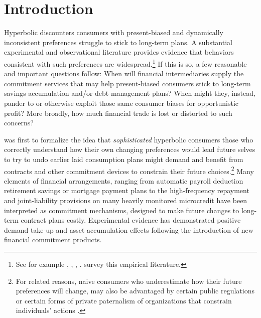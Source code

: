 \documentclass[11pt,english]{article}
\theoremstyle{plain}
\theoremstyle{definition}
\begin{document}
\section{Introduction}

Hyperbolic discounters \textendash{} consumers with present-biased
and dynamically inconsistent preferences \textendash{} struggle to
stick to long-term plans. A substantial experimental and observational
literature provides evidence that behaviors consistent with such preferences
are widespread.\footnote{See for example \citet{ariely2002}, \citet{thaler2004},
\citet{ashraf2006}, \citet{bauer2012}. \citet{bryan2010}
survey this empirical literature.} If this is so, a few reasonable and important questions follow: When will financial intermediaries supply the commitment services
that may help present-biased consumers stick to long-term savings
accumulation and/or debt management plans? When might they, instead,
pander to or otherwise exploit
those same consumer biases
for opportunistic profit? More broadly, how much financial trade
is lost or distorted to such concerns?

\citet{strotz1956} was first to formalize the idea that \emph{sophisticated}
hyperbolic consumers \textendash{} those who correctly understand
how their own changing preferences would lead future selves to try
to undo earlier laid consumption plans \textendash{} might demand
and benefit from contracts and other commitment devices to constrain
their future choices.\footnote{For related reasons, naive consumers who underestimate how their future
preferences will change, may also be advantaged by certain public
regulations or certain forms of private paternalism of organizations
that constrain individuals' actions \citep{spiegler2011}.} Many elements of financial arrangements, ranging from automatic payroll
deduction retirement savings or mortgage payment plans to the high-frequency
repayment and joint-liability provisions on many heavily monitored microcredit have  been interpreted as commitment mechanisms, designed
to make future changes to long-term contract plans costly. Experimental
evidence has demonstrated
positive demand take-up and asset accumulation effects following the
introduction of new financial commitment products. 
\end{document}
